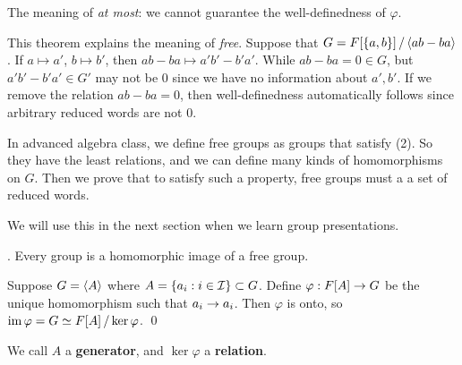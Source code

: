 The meaning of \textit{at most}: we cannot guarantee the well-definedness of \(\varphi\).

This theorem explains the meaning of \textit{free}. Suppose that \(G = F[\{a, b\}] \operatorname{/} \left\langle ab - ba \right\rangle\). If \(a \mapsto a'\), \(b \mapsto b'\), then \(ab-ba \mapsto a'b' - b'a'\). While \(ab - ba = 0 \in G\), but \(a'b' - b'a' \in G'\) may not be \(0\) since we have no information about \(a', b'\). If we remove the relation \(ab - ba = 0\), then well-definedness automatically follows since arbitrary reduced words are not \(0\).

In advanced algebra class, we define free groups as groups that satisfy (2). So they have the least relations, and we can define many kinds of homomorphisms on \(G\). Then we prove that to satisfy such a property, free groups must a a set of reduced words.

We will use this in the next section when we learn group presentations.

\thm. Every group is a homomorphic image of a free group.

\pf Suppose \(G = \left\langle A \right\rangle\) where \(A = \{a_i : i \in \mathcal{I}\} \subset G\). Define \(\varphi : F[A] \rightarrow G\) be the unique homomorphism such that \(a_i \rightarrow a_i\). Then \(\varphi\) is onto, so \(\operatorname{im} \varphi = G \simeq F[A] \operatorname{/} \ker \varphi\). \qed

We call \(A\) a \textbf{generator}, and \(\ker \varphi\) a \textbf{relation}.

\pagebreak
